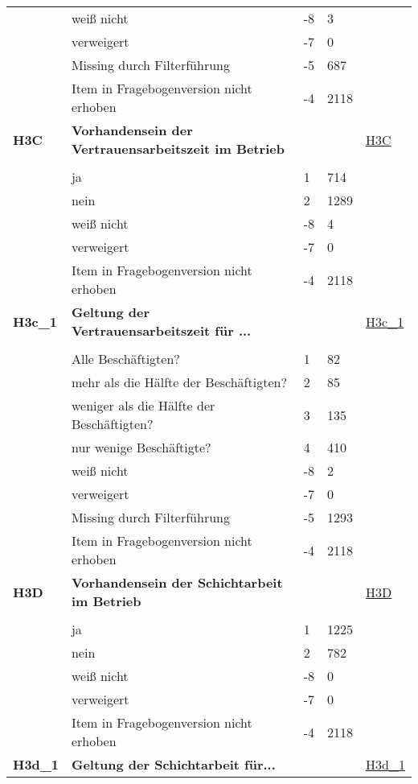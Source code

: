 \begin{longtable}{| L{2.5cm} | L{8.25cm}| C{1.5cm} | R{1.25cm} | C{2.25cm} |  }
   & weiß nicht & -8 & 3 &  \\ 
   & verweigert & -7 & 0 &  \\ 
   & Missing durch Filterführung & -5 & 687 &  \\ 
   & Item in Fragebogenversion nicht erhoben & -4 & 2118 &  \\ 
   \midrule
\textbf{H3C}\label{var:suf:H3C} & \textbf{Vorhandensein der Vertrauensarbeitszeit im Betrieb} &  &  & \hyperref[H3C]{H3C} \\ 
   &  &  &  &  \\ 
   & ja & 1 & 714 &  \\ 
   & nein & 2 & 1289 &  \\ 
   & weiß nicht & -8 & 4 &  \\ 
   & verweigert & -7 & 0 &  \\ 
   & Item in Fragebogenversion nicht erhoben & -4 & 2118 &  \\ 
   \midrule
\textbf{H3c\_1}\label{var:suf:H3c:1} & \textbf{Geltung der Vertrauensarbeitszeit für ...} &  &  & \hyperref[H3c:1]{H3c\_1} \\ 
   &  &  &  &  \\ 
   & Alle Beschäftigten? & 1 & 82 &  \\ 
   & mehr als die Hälfte der Beschäftigten? & 2 & 85 &  \\ 
   & weniger als die Hälfte der Beschäftigten? & 3 & 135 &  \\ 
   & nur wenige Beschäftigte? & 4 & 410 &  \\ 
   & weiß nicht & -8 & 2 &  \\ 
   & verweigert & -7 & 0 &  \\ 
   & Missing durch Filterführung & -5 & 1293 &  \\ 
   & Item in Fragebogenversion nicht erhoben & -4 & 2118 &  \\ 
   \midrule
\textbf{H3D}\label{var:suf:H3D} & \textbf{Vorhandensein der Schichtarbeit im Betrieb} &  &  & \hyperref[H3D]{H3D} \\ 
   &  &  &  &  \\ 
   & ja & 1 & 1225 &  \\ 
   & nein & 2 & 782 &  \\ 
   & weiß nicht & -8 & 0 &  \\ 
   & verweigert & -7 & 0 &  \\ 
   & Item in Fragebogenversion nicht erhoben & -4 & 2118 &  \\ 
   \midrule
\textbf{H3d\_1}\label{var:suf:H3d:1} & \textbf{Geltung der Schichtarbeit für...} &  &  & \hyperref[H3d:1]{H3d\_1} \\ 

\end{longtable}

